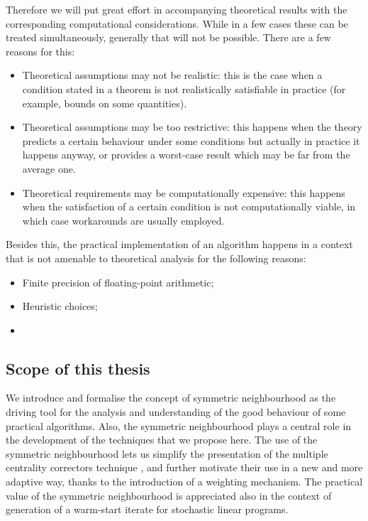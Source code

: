 Therefore we will put great effort in accompanying theoretical
results with the corresponding computational considerations. While
in a few cases these can be treated simultaneously, generally that
will not be possible. There are a few reasons for this:
\begin{itemize}
\item Theoretical assumptions may not be realistic: this is the case
when a condition stated in a theorem is not realistically satisfiable 
in practice (for example, bounds on some quantities). 
\item Theoretical assumptions may be too restrictive: this happens
when the theory predicts a certain behaviour under some conditions
but actually in practice it happens anyway, or provides a worst-case 
result which may be far from the average one.
\item Theoretical requirements may be computationally expensive: this 
happens when the satisfaction of a certain condition is not 
computationally viable, in which case workarounds are usually employed.
\end{itemize}

Besides this, the practical implementation of an algorithm happens
in a context that is not amenable to theoretical analysis for the
following reasons:
\begin{itemize}
\item Finite precision of floating-point arithmetic;
\item Heuristic choices;
\item 
\end{itemize}

%
%
\subsection{Scope of this thesis}

We introduce and formalise the concept of symmetric neighbourhood as the
driving tool for the analysis and understanding of the good behaviour
of some practical algorithms. Also, the symmetric neighbourhood plays
a central role in the development of the techniques that we propose here.
%
The use of the symmetric neighbourhood lets us simplify the presentation
of the multiple centrality correctors technique \cite{Gondzio96}, and
further motivate their use in a new and more adaptive way, thanks to the 
introduction of a weighting mechanism.
%
The practical value of the symmetric neighbourhood is appreciated also
in the context of generation of a warm-start iterate for stochastic
linear programs.

